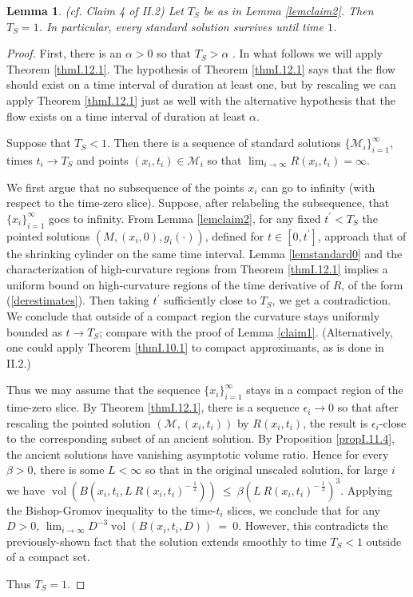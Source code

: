 \documentclass[12pt]{amsart}
\newcommand{\M}{{\mathcal M}}
\newcommand{\vol}{\operatorname{vol}}
\numberwithin{equation}{section}
\theoremstyle{plain}
\newtheorem{lemma}[equation]{Lemma}
\theoremstyle{definition}
\theoremstyle{remark}
\begin{document}
\begin{lemma} (cf. Claim 4 of II.2) \label{lemclaim4}
Let $T_S$ be as in  Lemma \ref{lemclaim2}. Then $T_S=1$.
In particular, every standard solution survives until time $1$.
\end{lemma}
\begin{proof}
First, there is an 
$\alpha > 0$ 
so that $T_S > \alpha$ \cite[Theorem 1.1]{Shi2 (1989)}.
In what follows we will apply Theorem \ref{thmI.12.1}. The 
hypothesis of Theorem \ref{thmI.12.1} says that the flow
should exist on a time interval of duration at least one,
but by 
rescaling we can apply Theorem \ref{thmI.12.1} just as well
with the alternative hypothesis that the
flow exists on a time interval of duration
at least $\alpha$.

Suppose that $T_S < 1$. 
Then there is a sequence of standard solutions
$\{\M_i\}_{i=1}^\infty$, 
times $t_i \rightarrow T_S$ and points $(x_i,t_i)\in \M_i$ so that
$\lim_{i \rightarrow \infty} R(x_i, t_i) = \infty$. 

We first
argue that no subsequence of the points $x_i$ can go to infinity (with respect
to the time-zero slice). Suppose, after relabeling the subsequence, that
$\{x_i\}_{i=1}^\infty$ goes to infinity.
From Lemma \ref{lemclaim2}, 
for any fixed $t^\prime < T_S$ the pointed solutions 
$(M,(x_i, 0), g_i(\cdot))$, defined for $t \in [0, t^\prime]$, 
approach that of the shrinking cylinder on the same time interval.
Lemma \ref{lemstandard0} and the characterization of high-curvature regions from
Theorem \ref{thmI.12.1} implies a
uniform bound on high-curvature regions of the time derivative of $R$, of the form
(\ref{derestimates}). Then taking $t^\prime$
sufficiently close to $T_S$, we get a contradiction.
We conclude that outside of a compact
region the curvature stays uniformly bounded as $t \rightarrow T_S$;
compare with the proof of Lemma \ref{claim1}.
(Alternatively, one could apply Theorem \ref{thmI.10.1} to compact
approximants, as is done in II.2.)

Thus we may assume that
the sequence $\{x_i\}_{i=1}^\infty$ stays in a compact region of the
time-zero slice. By Theorem \ref{thmI.12.1}, 
there is a sequence $\epsilon_i \rightarrow 0$
so that after rescaling the pointed solution
$(\M, (x_i, t_i))$ by $R(x_i, t_i)$, the result is $\epsilon_i$-close
to the corresponding subset of an ancient solution. By 
Proposition \ref{propI.11.4}, 
the ancient solutions have vanishing asymptotic volume ratio.
Hence for every $\beta > 0$, there is some $L < \infty$ so that
in the original unscaled solution, for large $i$ we have
$\vol \left( B(x_i, t_i, L \: R(x_i, t_i)^{- \: \frac12} ) \right)
\: \le \: \beta \left( L \: R(x_i, t_i)^{- \: \frac12} \right)^3$.
Applying the Bishop-Gromov inequality to the time-$t_i$ slices, we
conclude that for any $D >0$,
$\lim_{i \rightarrow \infty}
D^{-3} \vol(B(x_i, t_i, D)) \: = \: 0$.
However, this contradicts the
previously-shown fact that the solution extends smoothly to time $T_S < 1$
outside of a compact set.

Thus $T_S=1$. 
\end{proof}
\end{document}
